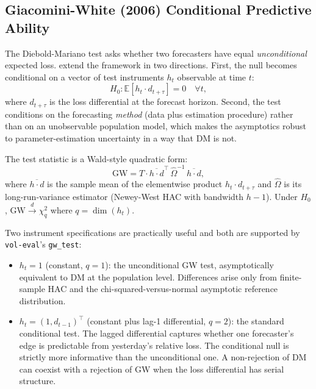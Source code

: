 \subsection{Giacomini-White (2006) Conditional Predictive Ability}\label{sec:gw}

\sloppy

The Diebold-Mariano test asks whether two forecasters have equal \emph{unconditional} expected loss. \citet{GiacominiWhite2006} extend the framework in two directions. First, the null becomes conditional on a vector of test instruments $h_t$ observable at time $t$:
\begin{equation}
    H_0: \mathbb{E}\!\left[ h_t \cdot d_{t+\tau} \right] = 0 \quad \forall t,
\end{equation}
where $d_{t+\tau}$ is the loss differential at the forecast horizon. Second, the test conditions on the forecasting \emph{method} (data plus estimation procedure) rather than on an unobservable population model, which makes the asymptotics robust to parameter-estimation uncertainty in a way that DM is not.

The test statistic is a Wald-style quadratic form:
\begin{equation}
    \text{GW} = T \cdot \overline{h \cdot d}^\top \, \widehat\Omega^{-1} \, \overline{h \cdot d},
\end{equation}
where $\overline{h \cdot d}$ is the sample mean of the elementwise product $h_t \cdot d_{t+\tau}$ and $\widehat\Omega$ is its long-run-variance estimator (Newey-West HAC with bandwidth $h-1$). Under $H_0$, $\text{GW} \xrightarrow{d} \chi^2_q$ where $q = \dim(h_t)$.

Two instrument specifications are practically useful and both are supported by \texttt{vol-eval}'s \texttt{gw\_test}:

\begin{itemize}[leftmargin=*]
    \item $h_t = 1$ (constant, $q = 1$): the unconditional GW test, asymptotically equivalent to DM at the population level. Differences arise only from finite-sample HAC and the chi-squared-versus-normal asymptotic reference distribution.
    \item $h_t = (1, d_{t-1})^\top$ (constant plus lag-1 differential, $q = 2$): the standard conditional test. The lagged differential captures whether one forecaster's edge is predictable from yesterday's relative loss. The conditional null is strictly more informative than the unconditional one. A non-rejection of DM can coexist with a rejection of GW when the loss differential has serial structure.
\end{itemize}

